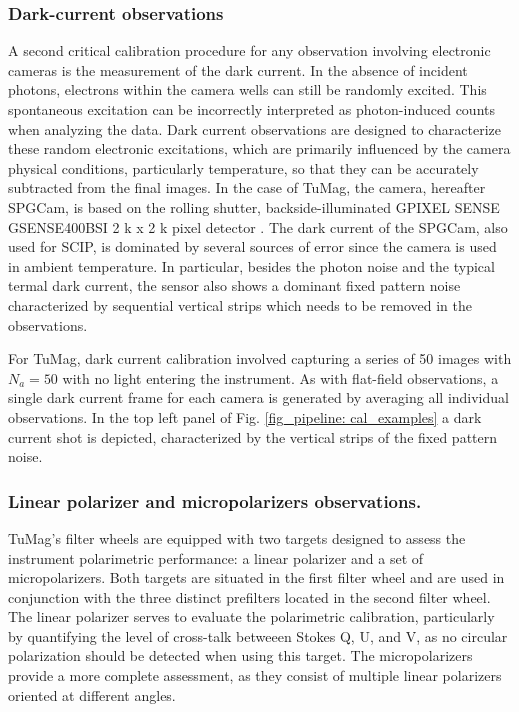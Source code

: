\subsubsection{Dark-current observations}

A second critical calibration procedure for any observation involving electronic cameras is the measurement of the dark current. In the absence of incident photons, electrons within the camera wells can still be randomly excited. This spontaneous excitation can be incorrectly interpreted as photon-induced counts when analyzing the data. Dark current observations are designed to characterize these random electronic excitations, which are primarily influenced by the camera physical conditions, particularly temperature, so that they can be accurately subtracted from the final images. In the case of TuMag, the camera, hereafter SPGCam,  is based on the rolling shutter, backside-illuminated GPIXEL SENSE GSENSE400BSI 2 k x 2 k pixel detector \citep{tumag-cams}. The dark current of the SPGCam, also used for SCIP, is dominated by several sources of error since the camera is used in ambient temperature. In particular, besides the photon noise and the typical termal dark current, the sensor also shows a dominant fixed pattern noise characterized by sequential vertical strips which needs to be removed in the observations.  

For TuMag, dark current calibration involved capturing a series of 50 images with $N_a = 50$ with no light entering the instrument. As with flat-field observations, a single dark current frame for each camera is generated by averaging all individual observations. In the top left panel of Fig. \ref{fig_pipeline: cal_examples} a dark current shot is depicted, characterized by the vertical strips of the fixed pattern noise.  

\subsubsection{Linear polarizer and micropolarizers observations.}

TuMag's filter wheels are equipped with two targets designed to assess the instrument polarimetric performance: a linear polarizer and a set of micropolarizers. Both targets are situated in the first filter wheel and are used in conjunction with the three distinct prefilters located in the second filter wheel. The linear polarizer serves to evaluate the polarimetric calibration, particularly by quantifying the level of cross-talk betweeen Stokes Q, U, and V, as no circular polarization should be detected when using this target. The micropolarizers provide a more complete assessment, as they consist of multiple linear polarizers oriented at different angles. 

